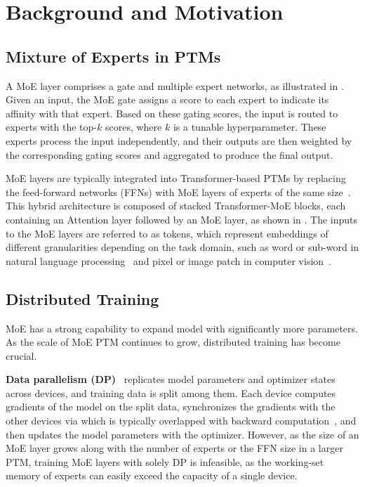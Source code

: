 \section{Background and Motivation}

\subsection{Mixture of Experts in PTMs}

A MoE layer comprises a gate and multiple expert networks, as illustrated in .
Given an input, the MoE gate assigns a score to each expert to indicate its affinity with that expert.
Based on these gating scores, the input is routed to experts with the top-$k$ scores, where $k$ is a tunable hyperparameter.
These experts process the input independently, and their outputs are then weighted by the corresponding gating scores and aggregated to produce the final output.

MoE layers are typically integrated into Transformer-based PTMs by replacing the feed-forward networks (FFNs) with MoE layers of experts of the same size~\cite{vaswani2017attention}. 
This hybrid architecture is composed of stacked Transformer-MoE blocks, each containing an Attention layer followed by an MoE layer, as shown in .
The inputs to the MoE layers are referred to as tokens, 
which represent embeddings of different granularities depending on the task domain, 
such as word or sub-word in natural language processing~\cite{Devlin2019BERTPO} and pixel or image patch in computer vision~\cite{alexey2020vit}.





\subsection{Distributed Training} 


MoE has a strong capability to expand model with significantly more parameters.
As the scale of MoE PTM continues to grow, distributed training has become crucial.

\textbf{Data parallelism (DP)}~\cite{li2020pytorchddp} 
replicates model parameters and optimizer states across devices, and training data is split among them.
Each device computes gradients of the model on the split data, synchronizes the gradients with the other devices via \collar which is typically overlapped with backward computation~\cite{lamy2023breadth,hashemi2019tictac}, and then updates the model parameters with the optimizer.
However, as the size of an MoE layer grows along with the number of experts or the FFN size in a larger PTM, training MoE layers with solely DP is infeasible, as the working-set memory of experts can easily exceed the capacity of a single device.

